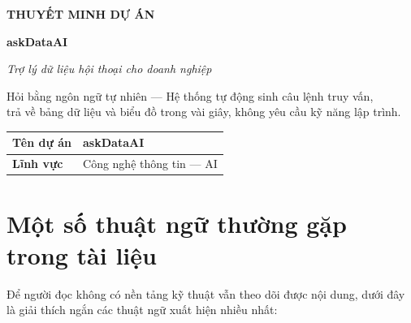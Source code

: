 \documentclass[11pt,a4paper]{article}
\begin{document}
\begin{titlepage}
\centering
\vspace*{2cm}
{\LARGE\bfseries THUYẾT MINH DỰ ÁN\par}
\vspace{0.6cm}
{\Huge\bfseries askDataAI\par}
\vspace{1.2cm}
{\large\itshape Trợ lý dữ liệu hội thoại cho doanh nghiệp\par}
\vspace{0.4cm}
{\normalsize Hỏi bằng ngôn ngữ tự nhiên — Hệ thống tự động sinh câu lệnh truy vấn,\\
trả về bảng dữ liệu và biểu đồ trong vài giây, không yêu cầu kỹ năng lập trình.\par}

\vspace{2cm}
\begin{tabular}{|l|p{8cm}|}
\hline
\textbf{Tên dự án} & askDataAI \\ \hline
\textbf{Lĩnh vực} & Công nghệ thông tin --- AI \\ \hline
\end{tabular}

\vfill
\end{titlepage}

\tableofcontents
\newpage

\section*{Một số thuật ngữ thường gặp trong tài liệu}

Để người đọc không có nền tảng kỹ thuật vẫn theo dõi được nội dung, dưới đây là giải thích ngắn các thuật ngữ xuất hiện nhiều nhất:
\end{document}

